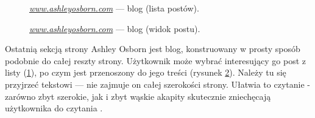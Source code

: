 \documentclass[12pt]{article}
\numberwithin{figure}{section}
\begin{document}
\begin{sloppypar}
\begin{figure}[H] 
    \centering
   \caption{\textit{\url{www.ashleyosborn.com}} --- blog (lista postów).}
   \label{fig:ashley-4.jpg}
\end{figure}

\begin{figure}[H] 
    \centering
   \caption{\textit{\url{www.ashleyosborn.com}} --- blog (widok postu).}
   \label{fig:ashley-5.jpg}
\end{figure}

\newpage

Ostatnią sekcją strony Ashley Osborn jest blog, konstruowany w prosty sposób podobnie do całej reszty strony. Użytkownik może wybrać interesujący go post z listy (\ref{fig:ashley-4.jpg}), po czym jest przenoszony do jego treści (rysunek \ref{fig:ashley-5.jpg}). Należy tu się przyjrzeć tekstowi --- nie zajmuje on całej szerokości strony. Ułatwia to czytanie - zarówno zbyt szerokie, jak i zbyt wąskie akapity skutecznie zniechęcają użytkownika do czytania \cite{szerokosc}. 


\end{sloppypar}
\end{document}
